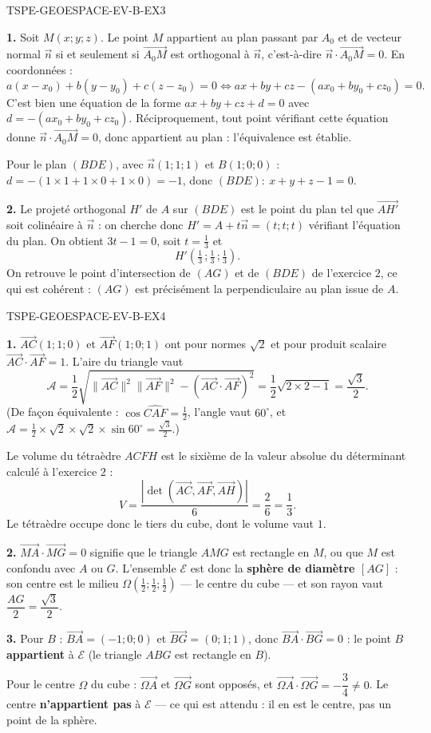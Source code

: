 \begin{corrige}{TSPE-GEOESPACE-EV-B-EX3}

\textbf{1.} Soit $M(x;y;z)$. Le point $M$ appartient au plan passant par $A_0$ et de vecteur
normal $\vec{n}$ si et seulement si $\vec{A_0M}$ est orthogonal à $\vec{n}$, c'est-à-dire
$\vec{n}\cdot\vec{A_0M}=0$. En coordonnées :
\[
  a(x-x_0)+b(y-y_0)+c(z-z_0)=0
  \iff ax+by+cz-\left(ax_0+by_0+cz_0\right)=0 .
\]
C'est bien une équation de la forme $ax+by+cz+d=0$ avec $d=-(ax_0+by_0+cz_0)$.
Réciproquement, tout point vérifiant cette équation donne $\vec{n}\cdot\vec{A_0M}=0$, donc
appartient au plan : l'équivalence est établie.

Pour le plan $(BDE)$, avec $\vec{n}(1;1;1)$ et $B(1;0;0)$ :
$d=-(1\times1+1\times0+1\times0)=-1$, donc $(BDE):\ x+y+z-1=0$.

\textbf{2.} Le projeté orthogonal $H'$ de $A$ sur $(BDE)$ est le point du plan tel que
$\vec{AH'}$ soit colinéaire à $\vec{n}$ : on cherche donc $H'=A+t\vec{n}=(t;t;t)$ vérifiant
l'équation du plan. On obtient $3t-1=0$, soit $t=\tfrac13$ et
\[
  H'\left(\tfrac13\,;\tfrac13\,;\tfrac13\right).
\]
On retrouve le point d'intersection de $(AG)$ et de $(BDE)$ de l'exercice $2$, ce qui est
cohérent : $(AG)$ est précisément la perpendiculaire au plan issue de $A$.

\end{corrige}

\begin{corrige}{TSPE-GEOESPACE-EV-B-EX4}

\textbf{1.} $\vec{AC}(1;1;0)$ et $\vec{AF}(1;0;1)$ ont pour normes $\sqrt2$ et pour produit
scalaire $\vec{AC}\cdot\vec{AF}=1$. L'aire du triangle vaut
\[
  \mathcal{A}=\frac12\sqrt{\|\vec{AC}\|^2\|\vec{AF}\|^2-\left(\vec{AC}\cdot\vec{AF}\right)^2}
  =\frac12\sqrt{2\times2-1}=\frac{\sqrt3}{2}.
\]
(De façon équivalente : $\cos\widehat{CAF}=\tfrac12$, l'angle vaut $60^\circ$, et
$\mathcal{A}=\tfrac12\times\sqrt2\times\sqrt2\times\sin60^\circ=\tfrac{\sqrt3}{2}$.)

Le volume du tétraèdre $ACFH$ est le sixième de la valeur absolue du déterminant calculé à
l'exercice $2$ :
\[
  V=\frac{\left|\det\left(\vec{AC},\vec{AF},\vec{AH}\right)\right|}{6}=\frac{2}{6}=\frac13 .
\]
Le tétraèdre occupe donc le tiers du cube, dont le volume vaut $1$.

\textbf{2.} $\vec{MA}\cdot\vec{MG}=0$ signifie que le triangle $AMG$ est rectangle en $M$,
ou que $M$ est confondu avec $A$ ou $G$. L'ensemble $\mathcal{E}$ est donc la
\textbf{sphère de diamètre $[AG]$} : son centre est le milieu
$\Omega\left(\tfrac12;\tfrac12;\tfrac12\right)$ — le centre du cube — et son rayon vaut
$\dfrac{AG}{2}=\dfrac{\sqrt3}{2}$.

\textbf{3.} Pour $B$ : $\vec{BA}=(-1;0;0)$ et $\vec{BG}=(0;1;1)$, donc
$\vec{BA}\cdot\vec{BG}=0$ : le point $B$ \textbf{appartient} à $\mathcal{E}$ (le triangle
$ABG$ est rectangle en $B$).

Pour le centre $\Omega$ du cube : $\vec{\Omega A}$ et $\vec{\Omega G}$ sont opposés, et
$\vec{\Omega A}\cdot\vec{\Omega G}=-\dfrac34\neq0$. Le centre \textbf{n'appartient pas} à
$\mathcal{E}$ — ce qui est attendu : il en est le centre, pas un point de la sphère.

\end{corrige}
